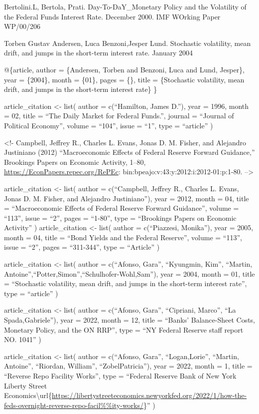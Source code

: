 \documentclass[
]{article}
\begin{document}
Bertolini.L, Bertola, Prati. Day-To-DaY\_Monetary Policy and the Volatility of the Federal Funds Interest Rate. December 2000. IMF WOrking Paper WP/00/206

Torben Gustav Andersen, Luca Benzoni,Jesper Lund. Stochastic volatility, mean drift, and jumps in the short-term interest rate. January 2004

@\{article,
author = \{Andersen, Torben and Benzoni, Luca and Lund, Jesper\},
year = \{2004\},
month = \{01\},
pages = \{\},
title = \{Stochastic volatility, mean drift, and jumps in the short-term interest rate\}
\}

article\_citation \textless- list(
author = c(``Hamilton, James D.''),
year = 1996,
month = 02,
title = ``The Daily Market for Federal Funds.'',
journal = ``Journal of Political Economy'',
volume = ``104'',
issue = ``1'',
type = ``article''
)

\textless!-
Campbell, Jeffrey R., Charles L. Evans, Jonas D. M. Fisher, and Alejandro Justiniano (2012) ``Macroeconomic Effects of Federal Reserve Forward Guidance,'' Brookings Papers on Economic Activity, 1--80, \url{https://EconPapers.repec.org/RePEc}:
bin:bpeajo:v:43:y:2012:i:2012-01:p:1-80.
--\textgreater{}

article\_citation \textless- list(
author = c(``Campbell, Jeffrey R., Charles L. Evans, Jonas D. M. Fisher, and Alejandro Justiniano''),
year = 2012,
month = 04,
title = ``Macroeconomic Effects of Federal Reserve Forward Guidance'',
volume = ``113'',
issue = ``2'',
pages = ``1-80'',
type = ``Brookings Papers on Economic Activity''
)
article\_citation \textless- list(
author = c(``Piazzesi, Monika''),
year = 2005,
month = 04,
title = ``Bond Yields and the Federal Reserve'',
volume = ``113'',
issue = ``2'',
pages = ``311-344'',
type = ``Article''
)

article\_citation \textless- list(
author = c(``Afonso, Gara'', ``Kyungmin, Kim'', ``Martin, Antoine'',``Potter,Simon'',``Schulhofer-Wohl,Sam''),
year = 2004,
month = 01,
title = ``Stochastic volatility, mean drift, and jumps in the short-term interest rate'',
type = ``article''
)

article\_citation \textless- list(
author = c(``Afonso, Gara'', ``Cipriani, Marco'', ``La Spada,Gabriele''),
year = 2022,
month = 12,
title = ``Banks' Balance-Sheet Costs, Monetary Policy, and the ON RRP'',
type = ``NY Federal Reserve staff report NO. 1041''
)

article\_citation \textless- list(
author = c(``Afonso, Gara'', ``Logan,Lorie'', ``Martin, Antoine'', ``Riordan, William'', ``ZobelPatricia''),
year = 2022,
month = 1,
title = ``Reverse Repo Facility Works'',
type = ``Federal Reserve Bank of New York Liberty Street Economics\textbackslash url\{\url{https://libertystreeteconomics.newyorkfed.org/2022/1/how-the-feds-overnight-reverse-repo-facil\%\%ity-works/}\}''
)
\end{document}
